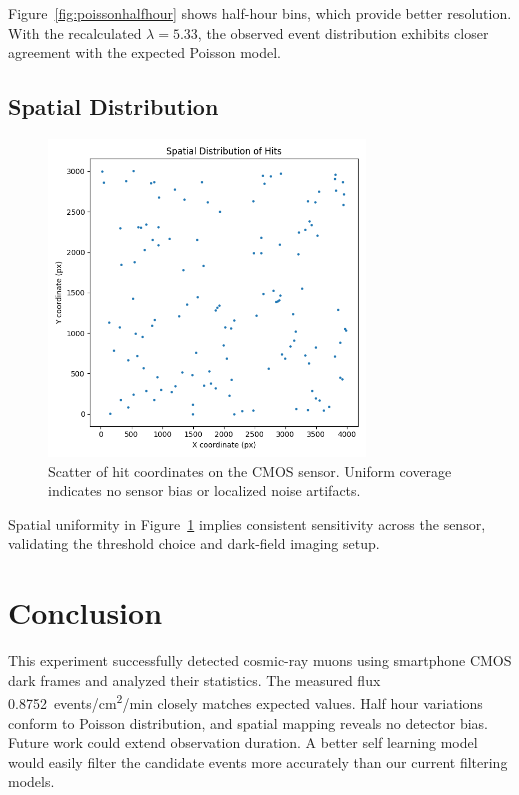 \documentclass[12pt]{article}
\begin{document}
	
	Figure~\ref{fig:poissonhalfhour} shows half-hour bins, which provide better resolution. With the recalculated $\lambda = 5.33$, the observed event distribution exhibits closer agreement with the expected Poisson model.
	
	
	
	\subsection{Spatial Distribution}
	\begin{figure}[H]
		\centering
		\includegraphics[width=0.75\textwidth]{../Data and notebooks/figures/spatial_distribution.png}
		\caption{Scatter of hit coordinates on the CMOS sensor. Uniform coverage indicates no sensor bias or localized noise artifacts.}
		\label{fig:spatial}
	\end{figure}
	
	Spatial uniformity in Figure~\ref{fig:spatial} implies consistent sensitivity across the sensor, validating the threshold choice and dark-field imaging setup.
	
	\section{Conclusion}
	This experiment successfully detected cosmic-ray muons using smartphone CMOS dark frames and analyzed their statistics. The measured flux \SI{0.8752}{events/cm^2/min} closely matches expected values. Half hour variations conform to Poisson distribution, and spatial mapping reveals no detector bias. Future work could extend observation duration. A better self learning model would easily filter the candidate events more accurately than our current filtering models.
	
\end{document}

